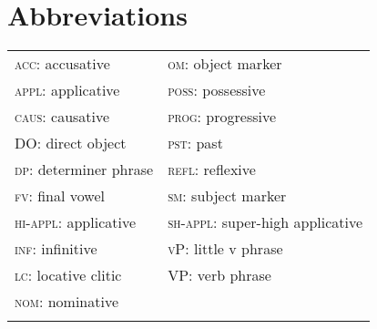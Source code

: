 \documentclass[output=paper,modfonts,nonflat]{langsci/langscibook}
\begin{document}
\section{Abbreviations}

\begin{styleBody}
\end{styleBody}

\tablefirsthead{}

\tabletail{}
\tablelasttail{}
\begin{tabularx}{\textwidth}{XX}
\lsptoprule
\textsc{acc:} accusative & \textsc{om:} object marker\\
\textsc{appl:} applicative & \textsc{poss:} possessive\\
\textsc{caus:} causative & \textsc{prog:} progressive\\
DO\textsc{:} direct object & \textsc{pst:} past\\
\textsc{dp:} determiner phrase & \textsc{refl:} reflexive\\
\textsc{fv:} final vowel & \textsc{sm:} subject marker\\
\textsc{hi-appl:} applicative & \textsc{sh-appl:} super-high applicative\\
\textsc{inf:} infinitive & \textsc{vP:} little v phrase\\
\textsc{lc:} locative clitic & \textsc{VP:} verb phrase\\
\textsc{nom:} nominative & \\
\lspbottomrule
\end{tabularx}
\end{document}
